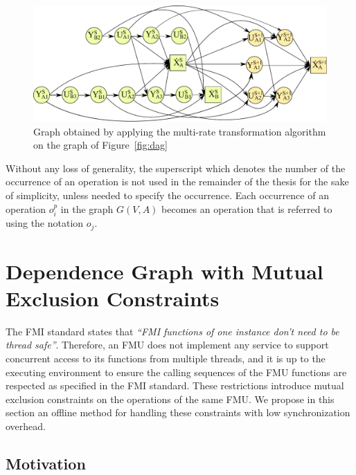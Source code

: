 \begin{figure}[htb]
\captionsetup{justification=centering}
\centering
  \includegraphics[scale=0.5]{figures/Operation_Graph_Two_Models_Multirate}
\caption{Graph obtained by applying the multi-rate transformation algorithm on the graph of Figure~\ref{fig:dag}}
\label{fig:dagmr}
\end{figure}

Without any loss of generality, the superscript which denotes the number of the occurrence of an operation is not used in the remainder of the thesis for the sake of simplicity, unless needed to specify the occurrence. Each occurrence of an operation $o_i^p$ in the graph $G(V,A)$ becomes an operation that is referred to using the notation $o_j$.

\section{Dependence Graph with Mutual Exclusion Constraints}
The FMI standard states that \textit{``FMI functions of one instance don't need to be thread safe''}. Therefore, an FMU does not implement any service to support concurrent access to its functions from multiple threads, and it is up to the executing environment to ensure the calling sequences of the FMU functions are respected as specified in the FMI standard. These restrictions introduce mutual exclusion constraints on the operations of the same FMU. We propose in this section an offline method for handling these constraints with low synchronization overhead.

\subsection{Motivation}

